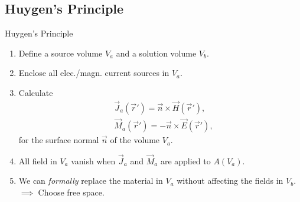\subsection{Huygen's Principle}
\begin{recipe}{Huygen's Principle}
  \begin{enumerate}
    \item Define a source volume $V_{a}$ and a solution volume $V_{b}$.
    \item Enclose all elec./magn. current sources in $V_{a}$.
    \item Calculate
          \begin{align*}
            &\vec{J}_{a}(\vec{r}') = \vec{n} \times \vec{H}(\vec{r}'),\\
            &\vec{M}_{a}(\vec{r}') = -\vec{n} \times \vec{E}(\vec{r}'),
          \end{align*}
          for the surface normal $\vec{n}$ of the volume $V_{a}$.
    \item All field in $V_{a}$ vanish when $\vec{J}_{a}$ and $\vec{M}_{a}$ are applied to $A(V_{a})$.
    \item We can \textit{formally} replace the material in $V_{a}$ without affecting the fields in $V_{b}$. $\implies$ Choose free space.
  \end{enumerate}
\end{recipe}
